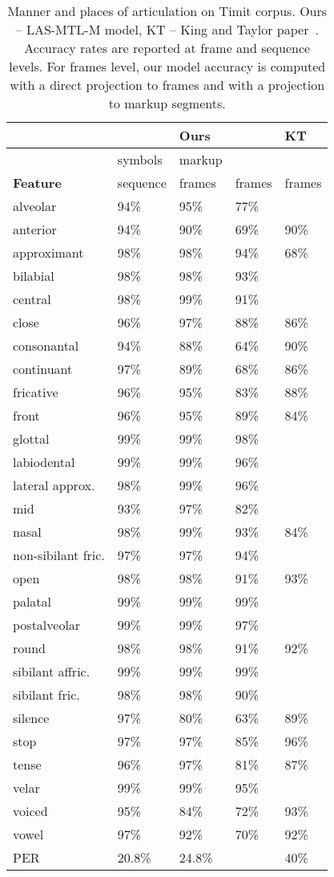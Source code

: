 \documentclass[a4paper]{article}
\begin{document}
\begin{table}[th]
  \caption{Manner and places of articulation on Timit corpus. Ours -- LAS-MTL-M model, KT -- King and Taylor paper~\cite{King-2000}. Accuracy rates are reported at frame and sequence levels. For frames level, our model accuracy is computed with a direct projection to frames and with a projection to markup segments.}
  \label{tab:BinfTimit}
\centering
  \begin{tabular}{llll|l}
    \toprule
                     &  & \textbf{Ours} & & \textbf{KT} \\
    \midrule
                     & symbols & markup & & \\
    \textbf{Feature} & sequence & frames & frames & frames \\
    \midrule
alveolar & 94\% & 95\% & 77\% \\
anterior & 94\% & 90\% & 69\% & 90\% \\
approximant & 98\% & 98\% & 94\% & 68\% \\
bilabial & 98\% & 98\% & 93\% \\
central & 98\% & 99\% & 91\% \\
close & 96\% & 97\% & 88\% & 86\% \\
consonantal & 94\% & 88\% & 64\% & 90\% \\
continuant & 97\% & 89\% & 68\% & 86\% \\
fricative & 96\% & 95\% & 83\% & 88\% \\
front & 96\% & 95\% & 89\% & 84\% \\
glottal & 99\% & 99\% & 98\% \\
labiodental & 99\% & 99\% & 96\% \\
lateral approx. & 98\% & 99\% & 96\% \\
mid & 93\% & 97\% & 82\% & \\
nasal & 98\% & 99\% & 93\% & 84\% \\
non-sibilant fric. & 97\% & 97\% & 94\% \\
open & 98\% & 98\% & 91\% & 93\% \\
palatal & 99\% & 99\% & 99\% \\
postalveolar & 99\% & 99\% & 97\% \\
round & 98\% & 98\% & 91\% & 92\% \\
sibilant affric. & 99\% & 99\% & 99\% \\
sibilant fric. & 98\% & 98\% & 90\% \\
silence & 97\% & 80\% & 63\% & 89\% \\
stop & 97\% & 97\% & 85\% & 96\% \\
tense & 96\% & 97\% & 81\% & 87\% \\
velar & 99\% & 99\% & 95\% \\
voiced & 95\% & 84\% & 72\% & 93\% \\
vowel & 97\% & 92\% & 70\% & 92\% \\
    \midrule
PER & 20.8\% & 24.8\% &  & 40\% \\
    \bottomrule
  \end{tabular}
\end{table}
\end{document}
